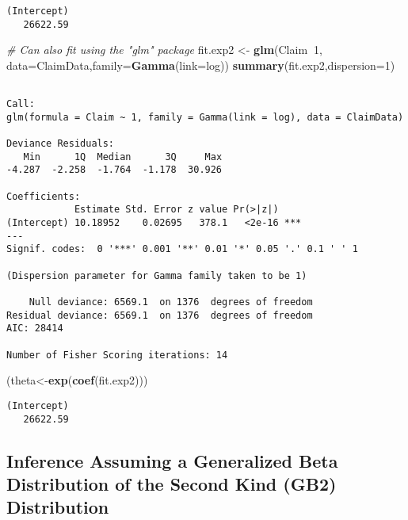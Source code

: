 \documentclass[]{book}
\newenvironment{Shaded}{\begin{snugshade}}{\end{snugshade}}
\newcommand{\KeywordTok}[1]{\textcolor[rgb]{0.13,0.29,0.53}{\textbf{#1}}}
\newcommand{\DataTypeTok}[1]{\textcolor[rgb]{0.13,0.29,0.53}{#1}}
\newcommand{\DecValTok}[1]{\textcolor[rgb]{0.00,0.00,0.81}{#1}}
\newcommand{\StringTok}[1]{\textcolor[rgb]{0.31,0.60,0.02}{#1}}
\newcommand{\CommentTok}[1]{\textcolor[rgb]{0.56,0.35,0.01}{\textit{#1}}}
\newcommand{\OperatorTok}[1]{\textcolor[rgb]{0.81,0.36,0.00}{\textbf{#1}}}
\newcommand{\NormalTok}[1]{#1}
\theoremstyle{definition}
\theoremstyle{definition}
\theoremstyle{definition}
\theoremstyle{remark}
\begin{document}
\begin{verbatim}
(Intercept) 
   26622.59 
\end{verbatim}

\begin{Shaded}
\begin{Highlighting}[]
\CommentTok{# Can also fit using the "glm" package}
\NormalTok{fit.exp2 <-}\StringTok{ }\KeywordTok{glm}\NormalTok{(Claim}\OperatorTok{~}\DecValTok{1}\NormalTok{, }\DataTypeTok{data=}\NormalTok{ClaimData,}\DataTypeTok{family=}\KeywordTok{Gamma}\NormalTok{(}\DataTypeTok{link=}\NormalTok{log)) }
\KeywordTok{summary}\NormalTok{(fit.exp2,}\DataTypeTok{dispersion=}\DecValTok{1}\NormalTok{)}
\end{Highlighting}
\end{Shaded}

\begin{verbatim}

Call:
glm(formula = Claim ~ 1, family = Gamma(link = log), data = ClaimData)

Deviance Residuals: 
   Min      1Q  Median      3Q     Max  
-4.287  -2.258  -1.764  -1.178  30.926  

Coefficients:
            Estimate Std. Error z value Pr(>|z|)    
(Intercept) 10.18952    0.02695   378.1   <2e-16 ***
---
Signif. codes:  0 '***' 0.001 '**' 0.01 '*' 0.05 '.' 0.1 ' ' 1

(Dispersion parameter for Gamma family taken to be 1)

    Null deviance: 6569.1  on 1376  degrees of freedom
Residual deviance: 6569.1  on 1376  degrees of freedom
AIC: 28414

Number of Fisher Scoring iterations: 14
\end{verbatim}

\begin{Shaded}
\begin{Highlighting}[]
\NormalTok{(theta<-}\KeywordTok{exp}\NormalTok{(}\KeywordTok{coef}\NormalTok{(fit.exp2)))  }
\end{Highlighting}
\end{Shaded}

\begin{verbatim}
(Intercept) 
   26622.59 
\end{verbatim}

\subsection{Inference Assuming a Generalized Beta Distribution of the
Second Kind (GB2)
Distribution}\label{inference-assuming-a-generalized-beta-distribution-of-the-second-kind-gb2-distribution}
\end{document}
